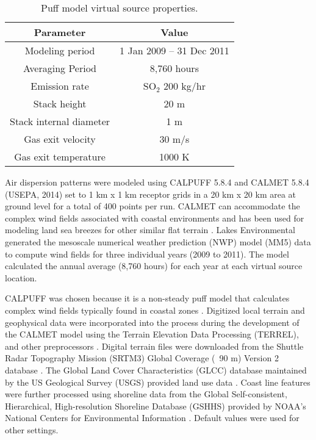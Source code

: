 \begin{table}[]
\centering
\caption{Puff model virtual source properties.}
\label{tb:puffmodel}
\begin{tabular}{@{}cc@{}}
\toprule
\textbf{Parameter}      & \textbf{Value}           \\ \midrule
Modeling period         & 1 Jan 2009 – 31 Dec 2011 \\
Averaging Period        & 8,760 hours              \\
Emission rate           & SO$_{2}$ 200 kg/hr       \\
Stack height            & 20 m                     \\
Stack internal diameter & 1 m                      \\
Gas exit velocity       & 30 m/s                   \\
Gas exit temperature    & 1000 K                   \\ \bottomrule
\end{tabular}
\end{table}

Air dispersion patterns were modeled using CALPUFF 5.8.4 and CALMET 5.8.4  (USEPA, 2014) set to 1 km x 1 km receptor grids in a 20 km x 20 km area at ground level for a total of 400 points per run.  CALMET can accommodate the complex wind fields associated with coastal environments and has been used for modeling land sea breezes for other similar flat terrain \citep{Mangia2010}. Lakes Environmental generated the mesoscale numerical weather prediction (NWP) model (MM5) data to compute wind fields for three individual years (2009 to 2011).  The model calculated the annual average (8,760 hours) for each year at each virtual source location. 

CALPUFF was chosen because it is a non-steady puff model that calculates complex wind fields typically found in coastal zones \citep{Ghannam2013a, Indumati2009, USEPA2014, Weiss2014}.  Digitized local terrain and geophysical data were incorporated into the process during the development of the CALMET model using the Terrain Elevation Data Processing (TERREL), and other preprocessors \citep{Scire2000}.  Digital terrain files were downloaded from the Shuttle Radar Topography Mission (SRTM3) Global Coverage (~90 m) Version 2 database \citep{USGS2000}.  The Global Land Cover Characteristics (GLCC) database maintained by the US Geological Survey (USGS) provided land use data \citep{USGS2008}.  Coast line features were further processed using shoreline data from the Global Self-consistent, Hierarchical, High-resolution Shoreline Database (GSHHS) provided by NOAA's National Centers for Environmental Information \citep{NOAA2015}.  Default values were used for other settings.

